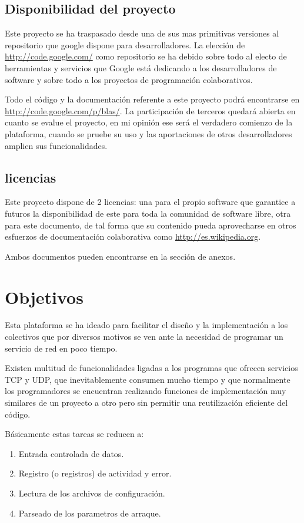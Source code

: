 \documentclass[a4paper,spanish,12pt]{book}
\begin{document}
\section{Disponibilidad del proyecto}
Este proyecto se ha traspasado desde una de sus mas primitivas versiones al repositorio que google dispone para desarrolladores. La elección de \url{http://code.google.com/} como repositorio se ha debido sobre todo al electo de herramientas y servicios que Google está dedicando a los desarrolladores de software y sobre todo a los proyectos de programación colaborativos.

Todo el código y la documentación referente a este proyecto podrá encontrarse en \url{http://code.google.com/p/blas/}. La participación de terceros quedará abierta en cuanto se evalue el proyecto, en mi opinión ese será el verdadero comienzo de la plataforma, cuando se pruebe su uso y las aportaciones de otros desarrolladores amplien sus funcionalidades.
\section{licencias}
Este proyecto dispone de 2 licencias: una para el propio software que garantice a futuros la disponibilidad de este para toda la comunidad de software libre, otra para este documento, de tal forma que su contenido pueda aprovecharse en otros esfuerzos de documentación colaborativa como \url{http://es.wikipedia.org}.

Ambos documentos pueden encontrarse en la sección de anexos.
\chapter{Objetivos}

Esta plataforma se ha ideado para facilitar el diseño y la implementación a los colectivos que por diversos motivos se ven ante la necesidad de programar un servicio de red en poco tiempo. 

Existen multitud de funcionalidades ligadas a los programas que ofrecen servicios TCP y UDP, que inevitablemente consumen mucho tiempo y que normalmente los programadores se encuentran realizando funciones de implementación muy similares de un proyecto a otro pero sin permitir una reutilización eficiente del código.

Básicamente estas tareas se reducen a:
\begin{enumerate}
	\item Entrada controlada de datos.
	\item Registro (o registros) de actividad y error.
	\item Lectura de los archivos de configuraci\'on.
	\item Parseado de los parametros de arraque.
\end{enumerate}
\end{document}
